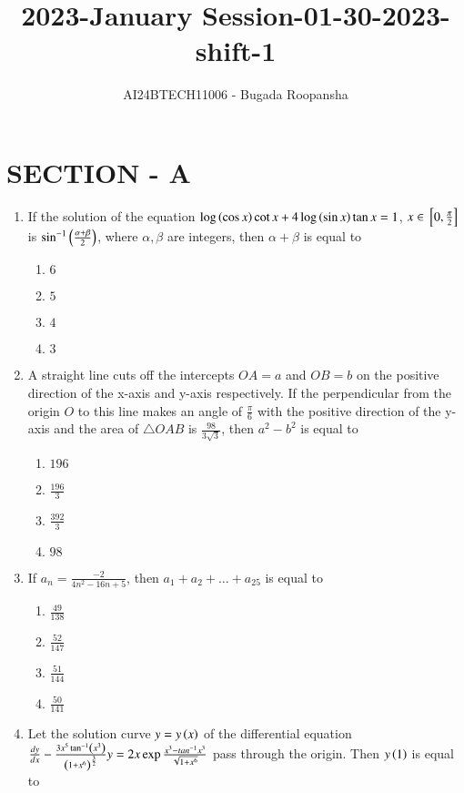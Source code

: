 \documentclass[journal,12pt,twocolumn]{IEEEtran}
\theoremstyle{remark}
\begin{document}

\vspace{3cm}
\title{2023-January Session-01-30-2023-shift-1}
\author{AI24BTECH11006 - Bugada Roopansha}
\maketitle
\section{SECTION - A}
\begin{enumerate}[start=16]
\item If the solution of the equation $\log\left(\cos{x}\right)\cot{x} + 4\log\left(\sin{x}\right)\tan{x} = 1$, $x \in {}\left[0, \frac{\pi}{2}\right]$ is $\sin^{-1}\left(\frac{\alpha + \beta}{2}\right)$, where $\alpha, \beta$ are integers, then $\alpha + \beta$ is equal to 
    \begin{enumerate}
    \item $6$
        \item $5$
        \item $4$
        \item $3$
    \end{enumerate}
\item A straight line cuts off the intercepts $OA = a$ and $OB = b$ on the positive direction of the x-axis and y-axis respectively. If the perpendicular from the origin $O$ to this line makes an angle of $\frac{\pi}{6}$ with the positive direction of the y-axis and the area of $\triangle OAB$ is $\frac{98}{3\sqrt{3}}$, then $a^2 - b^2$ is equal to 
    \begin{enumerate}
        \item $196$
        \item $\frac{196}{3}$
        \item $\frac{392}{3}$
        \item $98$
    \end{enumerate}
\item If $a_n=\frac{-2}{4n^2 - 16n + 5}$, then $a_1 + a_2 + \dots + a_{25}$ is equal to 
    \begin{enumerate}
        \item $\frac{49}{138}$
        \item $\frac{52}{147}$
        \item $\frac{51}{144}$
        \item $\frac{50}{141}$
    \end{enumerate}
\item Let the solution curve $y = y\left(x\right)$ of the differential equation $\frac{dy}{dx} - \frac{3 x^5 \tan^{-1}\left(x^3\right)}{\left(1+x^6\right)^\frac{3}{2}}y=2x\exp{\frac{x^3-tan^{-1} x^3}{\sqrt{1+x^6}}}$ pass through the origin. Then  $y\left(1\right)$ is equal to 

\end{enumerate}
\end{document}
